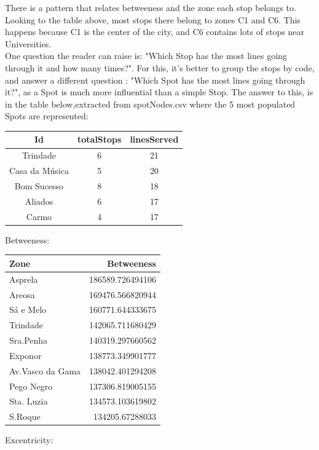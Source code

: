 \documentclass[12pt]{article}
\begin{document}
\begin{multicols}{2}
There is a pattern that relates betweeness and the zone each stop belongs to. Looking to the table above,  most stops there belong to zones C1 and C6. This happens because C1 is the center of the city, and C6 contains lots of stops near Universities.\\
One question the reader can raise is: "Which Stop has the most lines going through it and how many times?". For this, it's better to group the stops by code, and answer a different question : "Which Spot has the most lines going through it?", as a Spot is much more influential than a simple Stop. The answer to this, is in the table below,extracted from spotNodes.csv where the 5 most populated Spots are represented:
\begin{center}
\begin{tabular}[h]{ |c|c|c| }
\hline
    Id  & totalStops & linesServed\\
    \hline
    Trindade & 6  & 21 \\
    Casa da Música & 5 & 20 \\
    Bom Sucesso  & 8 & 18 \\
    Aliados & 6 & 17 \\
    Carmo & 4 & 17 \\
\hline
\end{tabular}
\end{center}
Betweeness:
\begin{center}
\begin{tabular}[h]{|l|r|}
\hline
Zone & Betweeness\\
\hline
Asprela & 186589.726494106\\
Areosa & 169476.566820944\\
Sá e Melo  & 160771.644333675\\
Trindade & 142065.711680429\\
Sra.Penha & 140319.297660562\\
Exponor & 138773.349901777\\
Av.Vasco da Gama & 138042.401294208\\
Pego Negro & 137306.819005155\\
Sta. Luzia & 134573.103619802\\
S.Roque & 134205.67288033\\
\hline
\end{tabular}
\end{center}
Excentricity:\\
\begin{center}
\begin{tabular}[h]{|c|c|}

\end{tabular}
\end{center}
\end{multicols}
\end{document}
